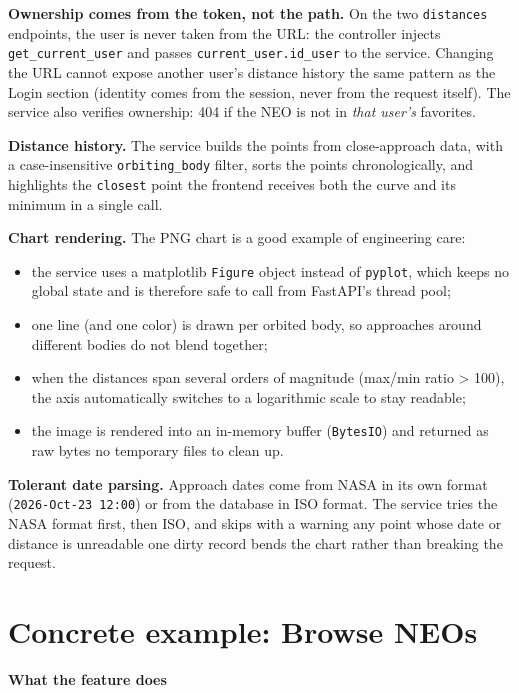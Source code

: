 \documentclass[
  french,
  11pt,
  a4paper,
]{report}
\providecommand{\tightlist}{%
  \setlength{\itemsep}{0pt}\setlength{\parskip}{0pt}}
\begin{document}
\textbf{Ownership comes from the token, not the path.} On the two
\texttt{distances} endpoints, the user is never taken from the URL: the
controller injects \texttt{get\_current\_user} and passes
\texttt{current\_user.id\_user} to the service. Changing the URL cannot
expose another user's distance history the same pattern as the Login
section (identity comes from the session, never from the request
itself). The service also verifies ownership: 404 if the NEO is not in
\emph{that user's} favorites.

\textbf{Distance history.} The service builds the points from
close-approach data, with a case-insensitive \texttt{orbiting\_body}
filter, sorts the points chronologically, and highlights the
\texttt{closest} point the frontend receives both the curve and its
minimum in a single call.

\textbf{Chart rendering.} The PNG chart is a good example of engineering
care:

\begin{itemize}
\tightlist
\item
  the service uses a matplotlib \texttt{Figure} object instead of
  \texttt{pyplot}, which keeps no global state and is therefore safe to
  call from FastAPI's thread pool;
\item
  one line (and one color) is drawn per orbited body, so approaches
  around different bodies do not blend together;
\item
  when the distances span several orders of magnitude (max/min ratio
  \textgreater{} 100), the axis automatically switches to a logarithmic
  scale to stay readable;
\item
  the image is rendered into an in-memory buffer (\texttt{BytesIO}) and
  returned as raw bytes no temporary files to clean up.
\end{itemize}

\textbf{Tolerant date parsing.} Approach dates come from NASA in its own
format (\texttt{2026-Oct-23\ 12:00}) or from the database in ISO format.
The service tries the NASA format first, then ISO, and skips with a
warning any point whose date or distance is unreadable one dirty record
bends the chart rather than breaking the request.

\section{Concrete example: Browse
NEOs}\label{concrete-example-browse-neos}

\textbf{What the feature does}
\end{document}
